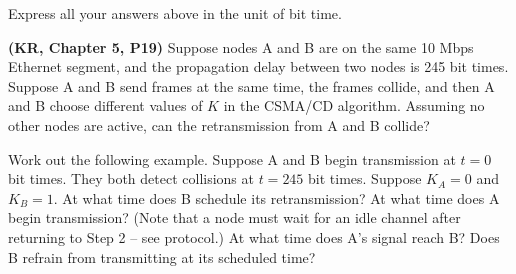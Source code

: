 \documentclass[a4paper,11pt,answers]{exam}
\begin{document}
\begin{questions}
	Express all your answers above in the unit of bit time.
	
	\question \textbf{(KR, Chapter 5, P19)}
	Suppose nodes A and B are on the same 10 Mbps Ethernet
	segment, and the propagation delay between two nodes is 245
	bit times.  Suppose A and B send frames at the same time,
	the frames collide, and then A and B choose different values
	of $K$ in the CSMA/CD algorithm.  Assuming no other nodes
	are active, can the retransmission from A and B collide?

	Work out the following example.  Suppose A and B begin
	transmission at $t = 0$ bit times.  They both detect
	collisions at $t = 245$ bit times.  Suppose $K_A =
	0$ and $K_B = 1$.  At what time does B schedule its
	retransmission?  At what time does A begin transmission?
	(Note that a node must wait for an idle channel after
	returning to Step 2 -- see protocol.)  At what time does
	A's signal reach B? Does B refrain from transmitting at its
	scheduled time?
    \end{questions}
\end{document}

